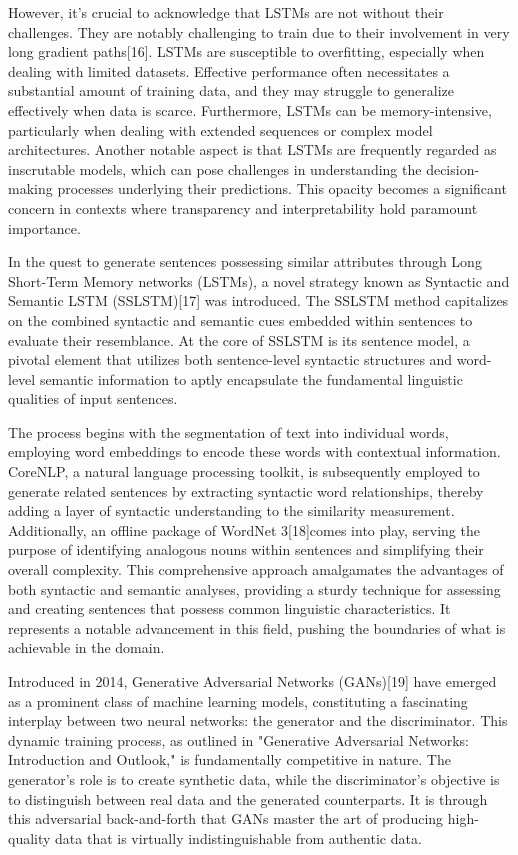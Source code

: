 \documentclass[conference]{IEEEtran}
\begin{document}
However, it's crucial to acknowledge that LSTMs are not without their challenges. They are notably challenging to train due to their involvement in very long gradient paths[16]. LSTMs are susceptible to overfitting, especially when dealing with limited datasets. Effective performance often necessitates a substantial amount of training data, and they may struggle to generalize effectively when data is scarce. Furthermore, LSTMs can be memory-intensive, particularly when dealing with extended sequences or complex model architectures. Another notable aspect is that LSTMs are frequently regarded as inscrutable models, which can pose challenges in understanding the decision-making processes underlying their predictions. This opacity becomes a significant concern in contexts where transparency and interpretability hold paramount importance.



In the quest to generate sentences possessing similar attributes through Long Short-Term Memory networks (LSTMs), a novel strategy known as Syntactic and Semantic LSTM (SSLSTM)[17] was introduced. The SSLSTM method capitalizes on the combined syntactic and semantic cues embedded within sentences to evaluate their resemblance. At the core of SSLSTM is its sentence model, a pivotal element that utilizes both sentence-level syntactic structures and word-level semantic information to aptly encapsulate the fundamental linguistic qualities of input sentences.


The process begins with the segmentation of text into individual words, employing word embeddings to encode these words with contextual information. CoreNLP, a natural language processing toolkit, is subsequently employed to generate related sentences by extracting syntactic word relationships, thereby adding a layer of syntactic understanding to the similarity measurement. Additionally, an offline package of WordNet 3[18]comes into play, serving the purpose of identifying analogous nouns within sentences and simplifying their overall complexity. This comprehensive approach amalgamates the advantages of both syntactic and semantic analyses, providing a sturdy technique for assessing and creating sentences that possess common linguistic characteristics. It represents a notable advancement in this field, pushing the boundaries of what is achievable in the domain.



Introduced in 2014, Generative Adversarial Networks (GANs)[19] have emerged as a prominent class of machine learning models, constituting a fascinating interplay between two neural networks: the generator and the discriminator. This dynamic training process, as outlined in "Generative Adversarial Networks: Introduction and Outlook," is fundamentally competitive in nature. The generator's role is to create synthetic data, while the discriminator's objective is to distinguish between real data and the generated counterparts. It is through this adversarial back-and-forth that GANs master the art of producing high-quality data that is virtually indistinguishable from authentic data.
\end{document}
